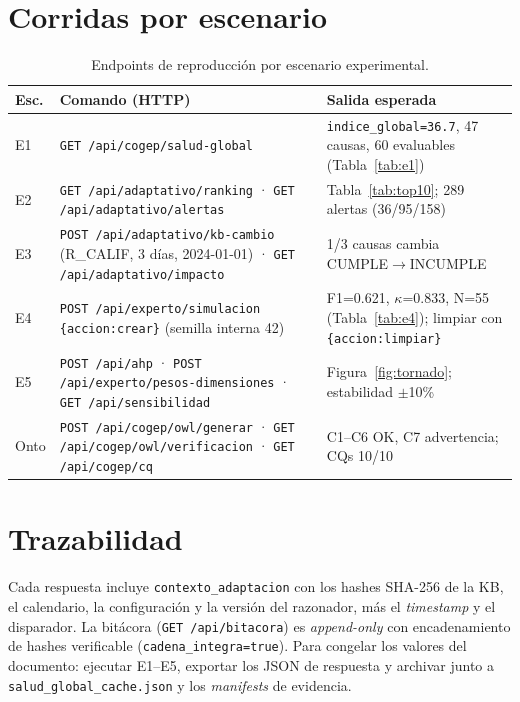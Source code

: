 \documentclass[a4paper,openany,12pt]{book}
\begin{document}
\section{Corridas por escenario}
\begin{table}[H]\centering\footnotesize
\caption{Endpoints de reproducción por escenario experimental.}\label{tab:repro}
\begin{tabular}{p{1.2cm}p{6.6cm}p{5.6cm}}\toprule
\textbf{Esc.} & \textbf{Comando (HTTP)} & \textbf{Salida esperada} \\ \midrule
E1 & \texttt{GET /api/cogep/salud-global} & \texttt{indice\_global=36.7}, 47 causas, 60 evaluables (Tabla~\ref{tab:e1}) \\
E2 & \texttt{GET /api/adaptativo/ranking} · \texttt{GET /api/adaptativo/alertas} & Tabla~\ref{tab:top10}; 289 alertas (36/95/158) \\
E3 & \texttt{POST /api/adaptativo/kb-cambio} (R\_CALIF, 3 días, 2024-01-01) · \texttt{GET /api/adaptativo/impacto} & 1/3 causas cambia CUMPLE$\to$INCUMPLE \\
E4 & \texttt{POST /api/experto/simulacion \{accion:crear\}} (semilla interna 42) & F1=0.621, $\kappa$=0.833, N=55 (Tabla~\ref{tab:e4}); limpiar con \texttt{\{accion:limpiar\}} \\
E5 & \texttt{POST /api/ahp} · \texttt{POST /api/experto/pesos-dimensiones} · \texttt{GET /api/sensibilidad} & Figura~\ref{fig:tornado}; estabilidad $\pm$10\% \\
Onto & \texttt{POST /api/cogep/owl/generar} · \texttt{GET /api/cogep/owl/verificacion} · \texttt{GET /api/cogep/cq} & C1--C6 OK, C7 advertencia; CQs 10/10 \\ \bottomrule
\end{tabular}\end{table}
\section{Trazabilidad}
Cada respuesta incluye \texttt{contexto\_adaptacion} con los hashes SHA-256 de la KB, el calendario, la configuración y la versión del razonador, más el \textit{timestamp} y el disparador. La bitácora (\texttt{GET /api/bitacora}) es \textit{append-only} con encadenamiento de hashes verificable (\texttt{cadena\_integra=true}). Para congelar los valores del documento: ejecutar E1--E5, exportar los JSON de respuesta y archivar junto a \texttt{salud\_global\_cache.json} y los \textit{manifests} de evidencia.



\end{document}
